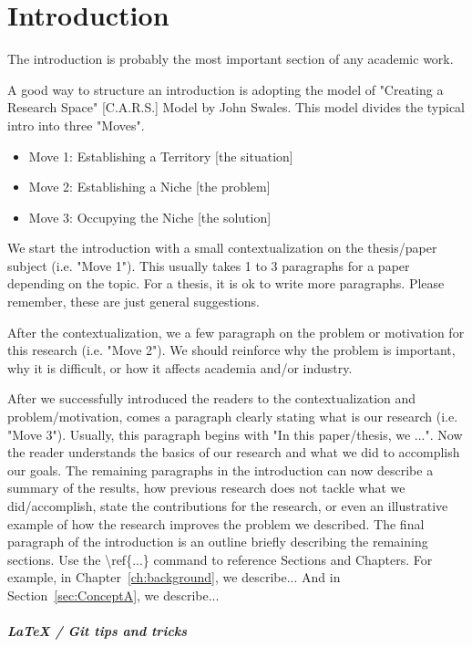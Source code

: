 
\chapter{Introduction}\label{ch:introduction}

The introduction is probably the most important section of any academic work. 

A good way to structure an introduction is adopting the model of "Creating a Research Space" [C.A.R.S.] Model by John Swales. This model divides the typical intro into three "Moves".
\begin{itemize}
\item Move 1: Establishing a Territory [the situation]
\item Move 2: Establishing a Niche [the problem]
\item Move 3: Occupying the Niche [the solution]
\end{itemize}


We start the introduction with a small contextualization on the thesis/paper subject (i.e. "Move 1").
This usually takes 1 to 3 paragraphs for a paper depending on the topic. 
For a thesis, it is ok to write more paragraphs. 
Please remember, these are just general suggestions.

After the contextualization, we a few paragraph on the problem or motivation for this research  (i.e. "Move 2"). 
We should reinforce why the problem is important, why it is difficult, or how it affects academia and/or industry. 

After we successfully introduced the readers to the contextualization and problem/motivation, comes a paragraph clearly stating what is our research (i.e. "Move 3").
Usually, this paragraph begins with "In this paper/thesis, we ...".
Now the reader understands the basics of our research and what we did to accomplish our goals. 
The remaining paragraphs in the introduction can now describe a summary of the results, how previous research does not tackle what we did/accomplish, state the contributions for the research, or even an illustrative example of how the research improves the problem we described. 
The final paragraph of the introduction is an outline briefly describing the remaining sections. 
Use the \textbackslash ref\{...\} command to reference Sections and Chapters. 
For example, in Chapter~\ref{ch:background}, we describe...
And in Section~\ref{sec:ConceptA}, we describe...

\paragraph{LaTeX / Git tips and tricks}

